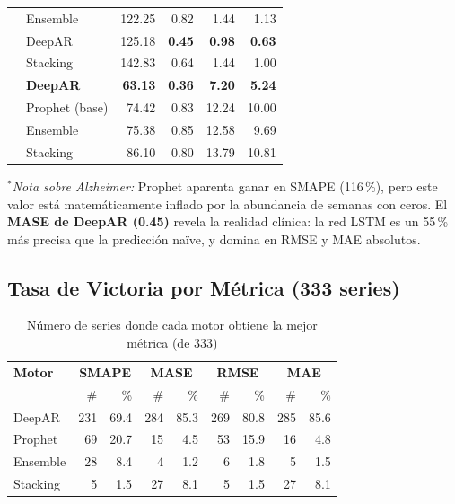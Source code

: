 \documentclass[12pt, letterpaper]{article}
\begin{document}
\begin{table}[H]
\begin{tabular}{ll rrrr}
  & Ensemble          & 122.25                & 0.82   & 1.44           & 1.13 \\
  & DeepAR            & 125.18                & \textbf{0.45} & \textbf{0.98} & \textbf{0.63} \\
  & Stacking          & 142.83                & 0.64   & 1.44           & 1.00 \\
\midrule
\rowcolor{cream!50}
\multirow{4}{*}{\textbf{Global (333)}}
  & \textbf{DeepAR}   & \textbf{63.13} & \textbf{0.36} & \textbf{7.20}  & \textbf{5.24} \\
  & Prophet (base)    & 74.42          & 0.83          & 12.24          & 10.00 \\
  & Ensemble          & 75.38          & 0.85          & 12.58          & 9.69 \\
  & Stacking          & 86.10          & 0.80          & 13.79          & 10.81 \\
\bottomrule
\end{tabular}
\vspace{0.2cm}

{\scriptsize $^{*}$\textit{Nota sobre Alzheimer:} Prophet aparenta ganar en SMAPE (116\,\%), pero este valor está matemáticamente inflado por la abundancia de semanas con ceros. El \textbf{MASE de DeepAR (0.45)} revela la realidad clínica: la red LSTM es un 55\,\% más precisa que la predicción naïve, y domina en RMSE y MAE absolutos.}
\end{table}

\subsection{Tasa de Victoria por Métrica (333 series)}

\begin{table}[H]
\centering
\caption{Número de series donde cada motor obtiene la mejor métrica (de 333)}
\label{tab:winrate}
\small
\begin{tabular}{l rr rr rr rr}
\toprule
\textbf{Motor} & \multicolumn{2}{c}{\textbf{SMAPE}} & \multicolumn{2}{c}{\textbf{MASE}} & \multicolumn{2}{c}{\textbf{RMSE}} & \multicolumn{2}{c}{\textbf{MAE}} \\
               & \#  & \%    & \#  & \%    & \#  & \%    & \#  & \%    \\
\midrule
\rowcolor{cdeepar!8}
DeepAR         & 231 & 69.4  & 284 & 85.3  & 269 & 80.8  & 285 & 85.6  \\
Prophet        & 69  & 20.7  & 15  & 4.5   & 53  & 15.9  & 16  & 4.8   \\
Ensemble       & 28  & 8.4   & 4   & 1.2   & 6   & 1.8   & 5   & 1.5   \\
Stacking       & 5   & 1.5   & 27  & 8.1   & 5   & 1.5   & 27  & 8.1   \\
\bottomrule
\end{tabular}
\end{table}
\end{document}

